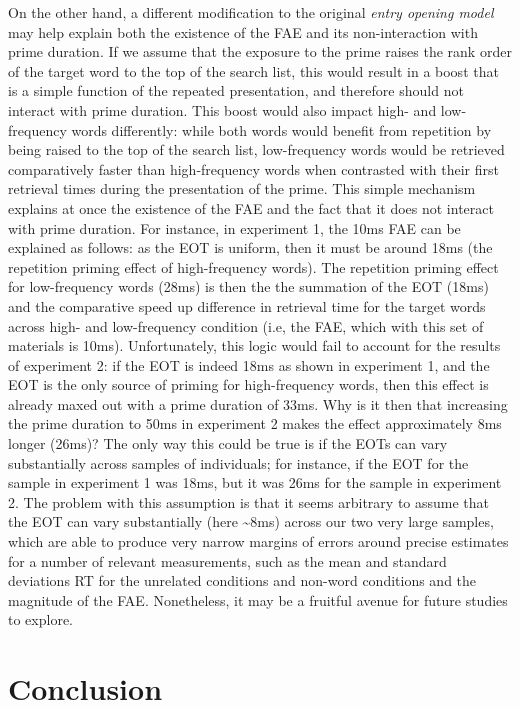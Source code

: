 \documentclass[
]{interact}
\begin{document}
On the other hand, a different modification to the original \emph{entry
opening model} may help explain both the existence of the FAE and its
non-interaction with prime duration. If we assume that the exposure to
the prime raises the rank order of the target word to the top of the
search list, this would result in a boost that is a simple function of
the repeated presentation, and therefore should not interact with prime
duration. This boost would also impact high- and low-frequency words
differently: while both words would benefit from repetition by being
raised to the top of the search list, low-frequency words would be
retrieved comparatively faster than high-frequency words when contrasted
with their first retrieval times during the presentation of the prime.
This simple mechanism explains at once the existence of the FAE and the
fact that it does not interact with prime duration. For instance, in
experiment 1, the 10ms FAE can be explained as follows: as the EOT is
uniform, then it must be around 18ms (the repetition priming effect of
high-frequency words). The repetition priming effect for low-frequency
words (28ms) is then the the summation of the EOT (18ms) and the
comparative speed up difference in retrieval time for the target words
across high- and low-frequency condition (i.e, the FAE, which with this
set of materials is 10ms). Unfortunately, this logic would fail to
account for the results of experiment 2: if the EOT is indeed 18ms as
shown in experiment 1, and the EOT is the only source of priming for
high-frequency words, then this effect is already maxed out with a prime
duration of 33ms. Why is it then that increasing the prime duration to
50ms in experiment 2 makes the effect approximately 8ms longer (26ms)?
The only way this could be true is if the EOTs can vary substantially
across samples of individuals; for instance, if the EOT for the sample
in experiment 1 was 18ms, but it was 26ms for the sample in experiment
2. The problem with this assumption is that it seems arbitrary to assume
that the EOT can vary substantially (here \textasciitilde8ms) across our
two very large samples, which are able to produce very narrow margins of
errors around precise estimates for a number of relevant measurements,
such as the mean and standard deviations RT for the unrelated conditions
and non-word conditions and the magnitude of the FAE. Nonetheless, it
may be a fruitful avenue for future studies to explore.

\section{Conclusion}\label{conclusion}
\end{document}
